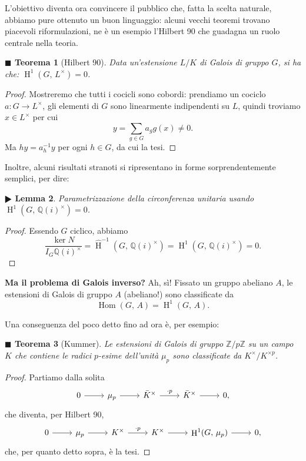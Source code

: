 \documentclass[a4paper]{article}
\newtheorem{theorem}{$ \blacksquare $ Teorema}
\newtheorem{lemma}[theorem]{$ \RHD $ Lemma}
\theoremstyle{remark}
\theoremstyle{definition}
\newcommand{\Z}{\mathbb{Z}}
\newcommand{\Q}{\mathbb{Q}}
\DeclareMathOperator{\Hom}{Hom}
\DeclareMathOperator{\HH}{H}
\begin{document}
L'obiettivo diventa ora convincere il pubblico che, fatta la scelta naturale, abbiamo pure ottenuto un buon linguaggio: alcuni vecchi teoremi trovano piacevoli riformulazioni, ne è un esempio l'Hilbert 90 che guadagna un ruolo centrale nella teoria.
\begin{theorem}[Hilbert 90]
	Data un'estensione $ L/K $ di Galois di gruppo $ G $, si ha che: $ \HH^1(G, \, L^\times) = 0 $.
\end{theorem}
\begin{proof}
	Mostreremo che tutti i cocicli sono cobordi: prendiamo un cociclo $ a \colon G \to L^\times $, gli elementi di $ G $ sono linearmente indipendenti su $ L $, quindi troviamo $ x \in L^\times $ per cui
	\[ y = \sum_{g \in G} a_g g(x) \neq 0. \]
	Ma $ hy = a_h^{-1}y $ per ogni $ h \in G $, da cui la tesi.
\end{proof}

Inoltre, alcuni risultati stranoti si ripresentano in forme sorprendentemente semplici, per dire:

\begin{lemma}
	Parametrizzazione della circonferenza unitaria usando $ \HH^1(G,\, \Q(i)^\times) = 0 $.
\end{lemma}
\begin{proof}
	Essendo $ G $ ciclico, abbiamo
	\[ \frac{\ker N}{I_G \Q(i)^\times} = \hat{\HH}^{-1}(G, \, \Q(i)^\times) = \HH^1(G, \, \Q(i)^\times) = 0. \]
\end{proof}


\textbf{Ma il problema di Galois inverso?} Ah, sì! Fissato un gruppo abeliano $ A $, le estensioni di Galois di gruppo $ A $ (abeliano!) sono classificate da
\[ \Hom(G,\, A) = \HH^1(G, \, A). \]

Una conseguenza del poco detto fino ad ora è, per esempio:

\begin{theorem}[Kummer]
	Le estensioni di Galois di gruppo $ \Z/p\Z $ su un campo $ K $ che contiene le radici $ p $-esime dell'unità $ \mu_p $ sono classificate da $ K^\times / K^{\times p} $.
\end{theorem}
\begin{proof}
	Partiamo dalla solita
	\[ \begin{tikzcd}
	0 \rar & \mu_p \rar & \bar{K}^\times \rar["\cdot p"] & \bar{K}^\times \rar & 0,
	\end{tikzcd} \]
	che diventa, per Hilbert 90, 
	\[ \begin{tikzcd}
	0 \rar & \mu_p \rar & K^\times \rar["\cdot p"] & K^\times \rar & \HH^1(G, \, \mu_p) \rar & 0,
	\end{tikzcd} \]
	che, per quanto detto sopra, è la tesi.
\end{proof}
\end{document}

